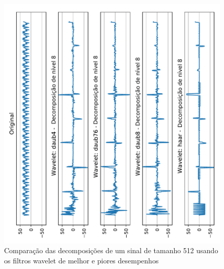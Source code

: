 	\begin{figure}[h]
		\centering
		\includegraphics[width=.93\linewidth,angle=-90]{images/results/haarDaubComparison/haarDaub42Comparison}
		\caption{Comparação das decomposições de um sinal de tamanho 512 usando os filtros wavelet de melhor e piores desempenhos }
		\label{fig:haardaub42comparison}
	\end{figure}
	
